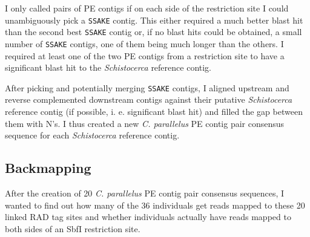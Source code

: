 \documentclass[a4paper,12pt,times,print,index,custombib,custommargin]{PhDThesisPSnPDF}\usepackage[]{graphicx}\usepackage[]{color}
\begin{document}
I only called pairs of PE contigs if on each side of the restriction site I could unambiguously pick a \texttt{SSAKE} contig. This either required a much better blast hit than the second best \texttt{SSAKE} contig or, if no blast hits could be obtained, a small number of \texttt{SSAKE} contigs, one of them being much longer than the others. I required at least one of the two PE contigs from a restriction site to have a significant blast hit to the \textit{Schistocerca} reference contig.

After picking and potentially merging \texttt{SSAKE} contigs, I aligned upstream and reverse complemented downstream contigs against their putative \textit{Schistocerca} reference contig (if possible, i. e. significant blast hit) and filled the gap between them with N's. I thus created a new \textit{C. parallelus} PE contig pair consensus sequence for each \textit{Schistocerca} reference contig. 

\FloatBarrier
\subsection{Backmapping}\label{ch:Backmapping}

After the creation of 20 \textit{C. parallelus} PE contig pair consensus sequences, I wanted to find out how many of the 36 individuals get reads mapped to these 20 \glspl{linked RAD tag site} and whether individuals actually have reads mapped to both sides of an SbfI restriction site. 
\end{document}

